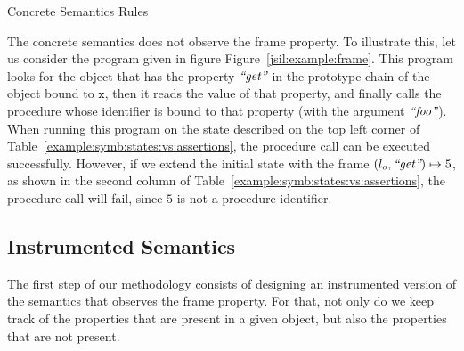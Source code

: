 \begin{display}{Concrete Semantics Rules}
{{
  }}
 \end{display}
\vspace{5pt}

The \jsil concrete semantics does not observe the frame property. To illustrate this,
let us consider the program given in figure Figure~\ref{jsil:example:frame}. 
This program looks for the object  that has the property $\text{{\it ``get''}}$ in the 
prototype chain of the object bound to $\mathtt{x}$, then it reads the value of that 
property, and finally calls the procedure whose identifier is bound to that property 
(with the argument $\text{{\it ``foo''}}$). 
When running this program on the state described on the top left corner of 
Table~\ref{example:symb:states:vs:assertions}, the procedure call can be executed 
successfully. However, if we extend the initial state with the frame $(l_o, \text{{\it ``get''}}) \mapsto 5$, 
as shown in the second column of Table~\ref{example:symb:states:vs:assertions}, the procedure 
call will fail, since $5$ is not a procedure identifier. 


\subsection{Instrumented Semantics}\label{subsec:instrumented}

The first step of our methodology %
consists of designing an instrumented version of the semantics that observes the frame property. 
%
For that, not only do we keep track of the properties that are present in a given object, but also the properties that 
are not present.

